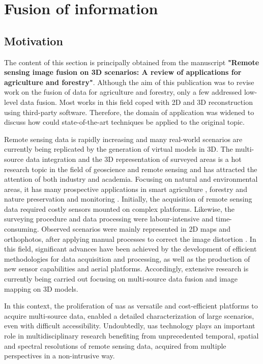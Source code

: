 \section{Fusion of information}

\subsection{Motivation}

The content of this section is principally obtained from the manuscript \textbf{"Remote sensing image fusion on 3D scenarios: A review of applications for agriculture and forestry"}. Although the aim of this publication was to revise work on the fusion of data for agriculture and forestry, only a few addressed low-level data fusion. Most works in this field coped with 2D and 3D reconstruction using third-party software. Therefore, the domain of application was widened to discuss how could state-of-the-art techniques be applied to the original topic.

Remote sensing data is rapidly increasing and many real-world scenarios are currently being replicated by the generation of virtual models in 3D. The multi-source data integration and the 3D representation of surveyed areas is a hot research topic in the field of geoscience and remote sensing and has attracted the attention of both industry and academia. Focusing on natural and environmental areas, it has many prospective applications in smart agriculture \cite{jurado_multispectral_2020, padua_vineyard_2019, poblete_discriminating_2021}, forestry and nature preservation \cite{almeida_monitoring_2021, guimaraes_forestry_2020, heckel_predicting_2020, schiefer_mapping_2020} and monitoring \cite{maimaitijiang_crop_2020}. Initially, the acquisition of remote sensing data required costly sensors mounted on complex platforms. Likewise, the surveying procedure and data processing were labour-intensive and time-consuming. Observed scenarios were mainly represented in 2D maps and orthophotos, after applying manual processes to correct the image distortion \cite{vong_how_2021}. In this field, significant advances have been achieved by the development of efficient methodologies for data acquisition and processing, as well as the production of new sensor capabilities and aerial platforms. Accordingly, extensive research is currently being carried out focusing on multi-source data fusion and image mapping on 3D models.

In this context, the proliferation of \acrshort{uas} as versatile and cost-efficient platforms to acquire multi-source data, enabled a detailed characterization of large scenarios, even with difficult accessibility. Undoubtedly, \acrshort{uas} technology plays an important role in multidisciplinary research benefiting from unprecedented temporal, spatial and spectral resolutions of remote sensing data, acquired from multiple perspectives in a non-intrusive way.

